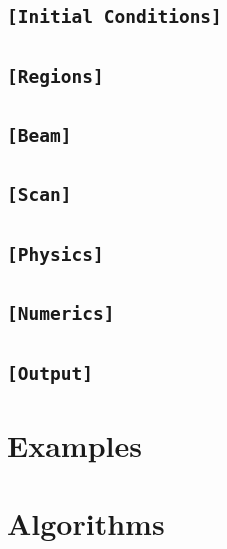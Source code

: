 \section{\texttt{[Initial Conditions]} ~}

%
\newpage
\section{\texttt{[Regions]} ~}

%
\newpage
\section{\texttt{[Beam]} ~}

%
\newpage
\section{\texttt{[Scan]} ~}

%
\newpage
\section{\texttt{[Physics]} ~}

%
\newpage
\section{\texttt{[Numerics]} ~}

%
\newpage
\section{\texttt{[Output]} ~}

%
\newpage
\chapter{Examples}
%

%
\chapter{Algorithms}
%
%
%
%
%


